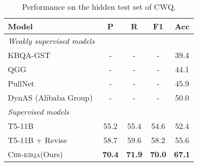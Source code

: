 \documentclass[11pt]{article}
\newcommand{\alg}{\textsc{Cbr-kbqa}\xspace}
\begin{document}
\begin{table}[t]
\centering
\footnotesize
\setlength{\tabcolsep}{4pt}
\begin{tabular}{@{}l c c c c@{}}
\toprule
Model & P & R & F1 & Acc \\
\midrule
\textit{Weakly supervised models} & & & & \\\midrule
KBQA-GST \cite{lan2019knowledge} & - & - & - & 39.4\\
QGG  \cite{lan2020query} & - & - & - & 44.1 \\
PullNet \cite{sun2019pullnet}& - & - & - & 45.9 \\
DynAS (Alibaba Group) & - & - & - & 50.0 \\
\midrule
\textit{Supervised models} & & & & \\\midrule
T5-11B \cite{t5} & 55.2 & 55.4 & 54.6 & 52.4\\
T5-11B + Revise & 58.7 & 59.6& 58.2& 55.6\\
\alg (Ours) & \textbf{70.4} & \textbf{71.9} & \textbf{70.0} & \textbf{67.1} \\
\bottomrule
\end{tabular}
\caption{Performance on the hidden test set of CWQ.} 
\label{tab:cwq_results}
\end{table}
\end{document}

